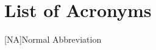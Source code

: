 \chapter{List of Acronyms}\label{chap:abbrev}
\begin{acronym}
    [NA]{Normal Abbreviation}
\end{acronym}